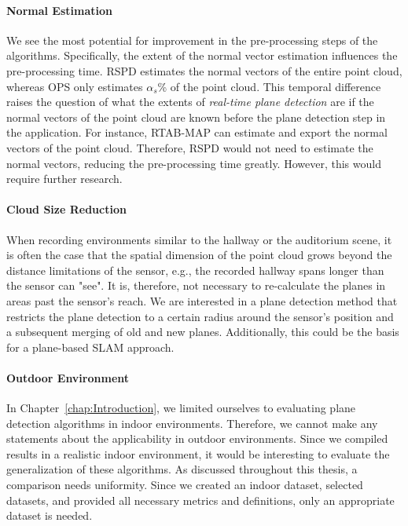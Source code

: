 \documentclass[main.tex]{subfiles}
\begin{document}
\paragraph{Normal Estimation}
We see the most potential for improvement in the pre-processing steps of the algorithms. Specifically, the extent of the normal vector estimation influences the pre-processing time. RSPD estimates the normal vectors of the entire point cloud, whereas OPS only estimates $\alpha_s$\% of the point cloud. This temporal difference raises the question of what the extents of \textit{real-time plane detection} are if the normal vectors of the point cloud are known before the plane detection step in the application. For instance, RTAB-MAP can estimate and export the normal vectors of the point cloud. Therefore, RSPD would not need to estimate the normal vectors, reducing the pre-processing time greatly. However, this would require further research.

\paragraph{Cloud Size Reduction}
When recording environments similar to the hallway or the auditorium scene, it is often the case that the spatial dimension of the point cloud grows beyond the distance limitations of the sensor, e.g., the recorded hallway spans longer than the sensor can "see". It is, therefore, not necessary to re-calculate the planes in areas past the sensor's reach. We are interested in a plane detection method that restricts the plane detection to a certain radius around the sensor's position and a subsequent merging of old and new planes. Additionally, this could be the basis for a plane-based SLAM approach.

\paragraph{Outdoor Environment}
In Chapter~\ref{chap:Introduction}, we limited ourselves to evaluating plane detection algorithms in indoor environments. Therefore, we cannot make any statements about the applicability in outdoor environments. Since we compiled results in a realistic indoor environment, it would be interesting to evaluate the generalization of these algorithms. As discussed throughout this thesis, a comparison needs uniformity. Since we created an indoor dataset, selected datasets, and provided all necessary metrics and definitions, only an appropriate dataset is needed.

\end{document}
